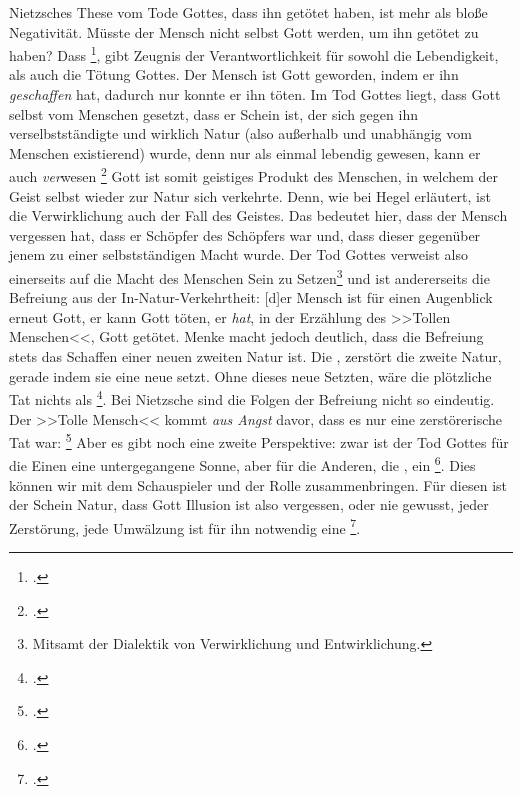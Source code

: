 \documentclass[12pt, a4paper, openany]{report}
\begin{document}
Nietzsches These vom Tode Gottes, dass  ihn getötet haben, ist mehr als bloße Negativität. 
Müsste der Mensch nicht selbst Gott werden, um ihn getötet zu haben?
Dass \footcite[][481]{nietzsche_morgenrote_1999}, gibt Zeugnis der Verantwortlichkeit für sowohl die Lebendigkeit, als auch die Tötung Gottes.
Der Mensch ist Gott geworden, indem er ihn \emph{geschaffen} hat, dadurch nur konnte er ihn töten. 
Im Tod Gottes liegt, dass Gott selbst vom Menschen gesetzt, dass er Schein ist, der sich gegen ihn verselbstständigte und wirklich Natur (also außerhalb und unabhängig vom Menschen existierend) wurde, denn nur als einmal lebendig gewesen, kann er auch \emph{ver}wesen \footcite[][481]{nietzsche_morgenrote_1999}
Gott ist somit geistiges Produkt des Menschen, in welchem der Geist selbst wieder zur Natur sich verkehrte.
Denn, wie bei Hegel erläutert, ist die Verwirklichung auch der Fall des Geistes.
Das bedeutet hier, dass der Mensch vergessen hat, dass er Schöpfer des Schöpfers war und, dass dieser gegenüber jenem zu einer selbstständigen Macht wurde.
Der Tod Gottes verweist also einerseits auf die Macht des Menschen Sein zu Setzen\footnote{Mitsamt der Dialektik von Verwirklichung und Entwirklichung.} und ist andererseits die Befreiung aus der In-Natur-Verkehrtheit:
[d]er Mensch ist für einen Augenblick erneut Gott, er kann Gott töten, er \emph{hat}, in der Erzählung des >>Tollen Menschen<<, Gott getötet.
Menke macht jedoch deutlich, dass die Befreiung stets das Schaffen einer neuen zweiten Natur ist. 
Die , zerstört die  zweite Natur, gerade indem sie eine neue setzt.
Ohne dieses neue Setzten, wäre die plötzliche Tat nichts als \footcite[][§5Z, S. 39]{hegel_grundlinien_2017}.
Bei Nietzsche sind die Folgen der Befreiung nicht so eindeutig.
Der >>Tolle Mensch<< kommt \emph{aus Angst} davor, dass es nur eine zerstörerische Tat war: \footcite[][481]{nietzsche_morgenrote_1999}
Aber es gibt noch eine zweite Perspektive: 
zwar ist der Tod Gottes für die Einen eine untergegangene Sonne, aber für die Anderen, die , ein \footcite[][SS. 573-574]{nietzsche_morgenrote_1999}.
Dies können wir mit dem Schauspieler und der Rolle zusammenbringen. 
Für diesen ist der Schein Natur, dass Gott Illusion ist also vergessen, oder nie gewusst, jeder Zerstörung, jede Umwälzung ist für ihn notwendig eine \footcite[][573]{nietzsche_morgenrote_1999}.
\end{document}

